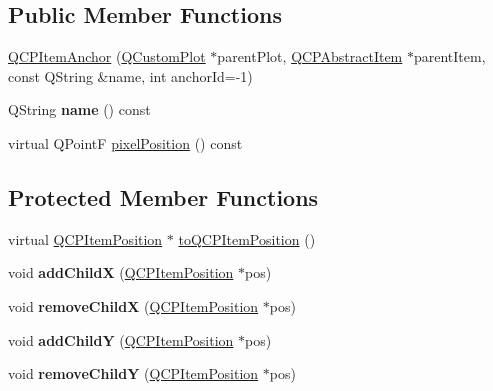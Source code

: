 \subsection*{Public Member Functions}
\begin{DoxyCompactItemize}
\item 
\hyperlink{classQCPItemAnchor_a32573023c6fa65b4496f1f995e5bfa5f}{Q\+C\+P\+Item\+Anchor} (\hyperlink{classQCustomPlot}{Q\+Custom\+Plot} $\ast$parent\+Plot, \hyperlink{classQCPAbstractItem}{Q\+C\+P\+Abstract\+Item} $\ast$parent\+Item, const Q\+String \&name, int anchor\+Id=-\/1)
\item 
Q\+String {\bfseries name} () const \hypertarget{classQCPItemAnchor_ac93984042a58c875e76847dc3e5f75fe}{}\label{classQCPItemAnchor_ac93984042a58c875e76847dc3e5f75fe}

\item 
virtual Q\+PointF \hyperlink{classQCPItemAnchor_a4e7e1764fcba37b532e833cb30fee4ee}{pixel\+Position} () const 
\end{DoxyCompactItemize}
\subsection*{Protected Member Functions}
\begin{DoxyCompactItemize}
\item 
virtual \hyperlink{classQCPItemPosition}{Q\+C\+P\+Item\+Position} $\ast$ \hyperlink{classQCPItemAnchor_ac54b20120669950255a63587193dbb86}{to\+Q\+C\+P\+Item\+Position} ()
\item 
void {\bfseries add\+ChildX} (\hyperlink{classQCPItemPosition}{Q\+C\+P\+Item\+Position} $\ast$pos)\hypertarget{classQCPItemAnchor_aef15daa640debfb11b0aeaa2116c6fbc}{}\label{classQCPItemAnchor_aef15daa640debfb11b0aeaa2116c6fbc}

\item 
void {\bfseries remove\+ChildX} (\hyperlink{classQCPItemPosition}{Q\+C\+P\+Item\+Position} $\ast$pos)\hypertarget{classQCPItemAnchor_a230b1d494cda63458e289bbe1b642599}{}\label{classQCPItemAnchor_a230b1d494cda63458e289bbe1b642599}

\item 
void {\bfseries add\+ChildY} (\hyperlink{classQCPItemPosition}{Q\+C\+P\+Item\+Position} $\ast$pos)\hypertarget{classQCPItemAnchor_af05dc56f24536f0c7a9a0f57b58cea67}{}\label{classQCPItemAnchor_af05dc56f24536f0c7a9a0f57b58cea67}

\item 
void {\bfseries remove\+ChildY} (\hyperlink{classQCPItemPosition}{Q\+C\+P\+Item\+Position} $\ast$pos)\hypertarget{classQCPItemAnchor_aa2394911d8fff3bd958b9f4f1994b64d}{}\label{classQCPItemAnchor_aa2394911d8fff3bd958b9f4f1994b64d}

\end{DoxyCompactItemize}
